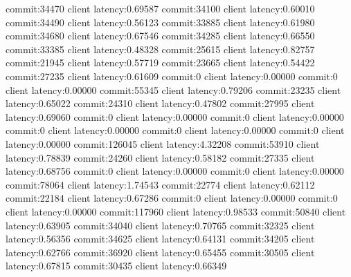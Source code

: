 commit:34470 client latency:0.69587
commit:34100 client latency:0.60010
commit:34490 client latency:0.56123
commit:33885 client latency:0.61980
commit:34680 client latency:0.67546
commit:34285 client latency:0.66550
commit:33385 client latency:0.48328
commit:25615 client latency:0.82757
commit:21945 client latency:0.57719
commit:23665 client latency:0.54422
commit:27235 client latency:0.61609
commit:0 client latency:0.00000
commit:0 client latency:0.00000
commit:55345 client latency:0.79206
commit:23235 client latency:0.65022
commit:24310 client latency:0.47802
commit:27995 client latency:0.69060
commit:0 client latency:0.00000
commit:0 client latency:0.00000
commit:0 client latency:0.00000
commit:0 client latency:0.00000
commit:0 client latency:0.00000
commit:126045 client latency:4.32208
commit:53910 client latency:0.78839
commit:24260 client latency:0.58182
commit:27335 client latency:0.68756
commit:0 client latency:0.00000
commit:0 client latency:0.00000
commit:78064 client latency:1.74543
commit:22774 client latency:0.62112
commit:22184 client latency:0.67286
commit:0 client latency:0.00000
commit:0 client latency:0.00000
commit:117960 client latency:0.98533
commit:50840 client latency:0.63905
commit:34040 client latency:0.70765
commit:32325 client latency:0.56356
commit:34625 client latency:0.64131
commit:34205 client latency:0.62766
commit:36920 client latency:0.65455
commit:30505 client latency:0.67815
commit:30435 client latency:0.66349
